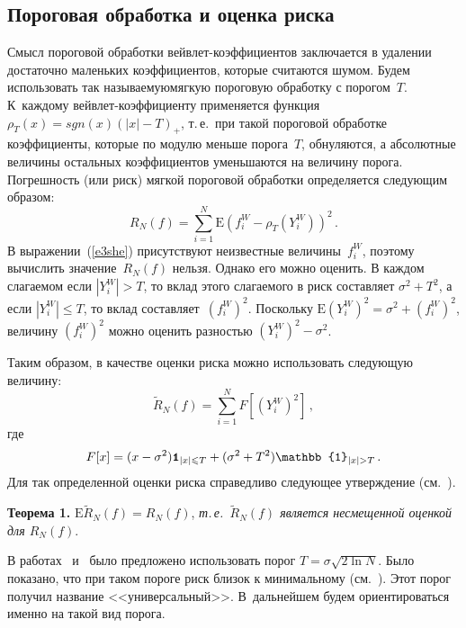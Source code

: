 \begin{multicols}{2}
\section{Пороговая обработка и оценка риска}

Смысл пороговой обработки вейвлет-ко\-эф\-фи\-ци\-ен\-тов заключается в удалении достаточно маленьких 
коэффициентов, которые считаются шумом. Будем использовать так называемую\linebreak мягкую пороговую обработку с порогом~$T$. 
К~каждому вейвлет-коэффи\-циен\-ту применяется функция $\rho_T(x)=sgn(x)\left(|x|-T\right)_{+}$, 
т.\,е.\ при такой пороговой обработке коэффициенты, которые по модулю меньше порога~$T$, обнуляются, 
а абсолютные величины остальных коэффициентов уменьшаются на величину порога.
Погрешность (или риск) мягкой пороговой обработки определяется следующим образом:
\begin{equation}
R_N(f)=\sum_{i=1}^{N}\mbox{E}\left(f^{W}_{i}-\rho_T(Y^W_i)\right)^2\,.
\label{e3she}
\end{equation}
В выражении~(\ref{e3she}) присутствуют неизвестные величины~$f^{W}_{i}$, поэтому вычислить значение~$R_N(f)$ нельзя. 
Однако его можно оценить. В каж\-дом слагаемом если $|Y^W_i|>T$, то вклад этого слагаемого в риск составляет 
$\sigma^2+T^2$, а если $|Y^W_i|\leqslant T$, то вклад составляет~$(f_i^W)^2$. 
Поскольку $\mbox{E}(Y_i^W)^2=\sigma^2+(f_i^W)^2$, величину $(f_i^W)^2$ можно оценить разностью $(Y_i^W)^2-\sigma^2$.

Таким образом, в качестве оценки риска можно использовать следующую величину:
\begin{equation}
\widetilde{R}_N(f)=\sum_{i=1}^{N}F[(Y_i^W)^2]\,,
\label{e4she}
\end{equation}
где 
$$
F[x]=(x-\sigma^2)\Ik_{|x|\leqslant T}+(\sigma^2+T^2)\mathbb{1}_{|x|>T}\,.
$$
Для так определенной оценки риска справедливо следующее утверждение (см.~\cite{9she}).

\medskip

\noindent
\textbf{Теорема 1.} $\mbox{E}\widetilde{R}_N(f)=R_N(f)$, \textit{т.\,е.\ $\widetilde{R}_N(f)$ является 
несмещенной оценкой для $R_N(f)$}.

\medskip

В работах~\cite{2she} и~\cite{3she} было предложено использовать порог $T=\sigma\sqrt{2\ln N}$. 
Было показано, что при таком пороге риск близок к минимальному (см.~\cite{2she}). 
Этот порог получил название <<универсальный>>. В~дальнейшем будем ориентироваться именно на такой вид порога.


\end{multicols}
